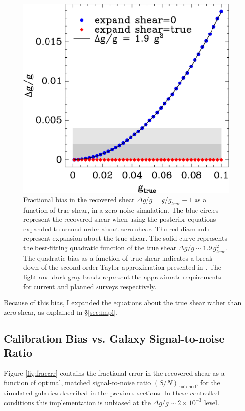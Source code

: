 \documentclass[usegraphicx,usenatbib]{mn2e}
\newcommand{\Msn}{$(S/N)_{\textrm{matched}}$}
\begin{document}
\begin{figure}
 \includegraphics[scale=0.45]{figures/fracerr-vs-shear.eps}
 \caption{Fractional bias in the recovered shear $\Delta g/g = g/g_{true}-1$
     as a function of true shear,
     in a zero noise simulation.  The blue circles represent the recovered
     shear when using the posterior equations expanded to second order about
     zero shear.  The red diamonds represent expansion about the true shear.
     The solid curve represents the best-fitting quadratic function of the true
     shear $\Delta g/g \sim 1.9~g^2_{true}$.  The quadratic bias as a function of
     true shear indicates a break down of the second-order Taylor approximation
 presented in \citet{ba14}. The light and dark gray bands represent the
 approximate requirements for current and planned surveys respectively.}
 \label{fig:nonoise}
\end{figure}

Because of this bias, I expanded the equations about the true shear rather than
zero shear, as explained in \S \ref{sec:impl}.

\subsection{Calibration Bias vs. Galaxy Signal-to-noise Ratio} \label{sec:snbias}

Figure \ref{fig:fracerr} contains the fractional error in the recovered shear
as a function of optimal, matched signal-to-noise ratio \Msn, for the simulated
galaxies described in the previous sections.  In these controlled conditions
this implementation is unbiased at the $\Delta g/g \sim 2\times 10^{-3}$ level.
\end{document}
